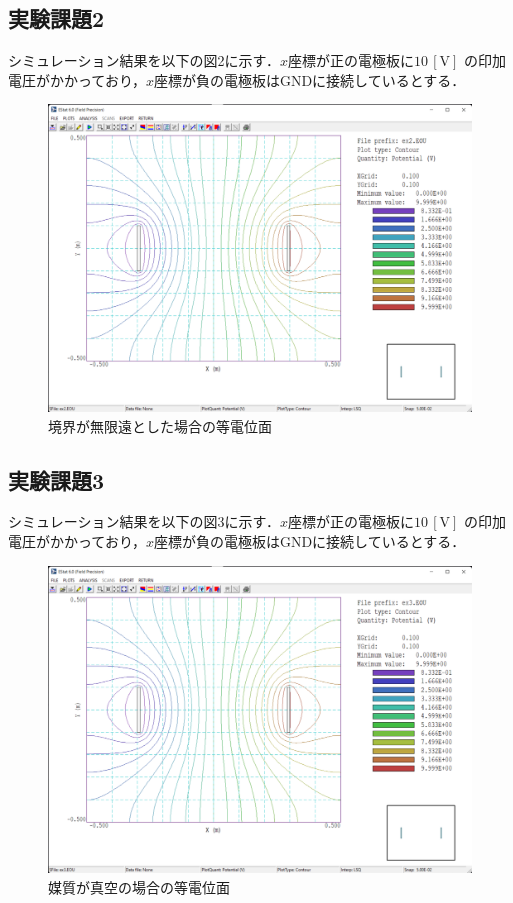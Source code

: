 \subsection{実験課題2}
シミュレーション結果を以下の図2に示す．$x$座標が正の電極板に$10\,[\si{\volt}]$
の印加電圧がかかっており，$x$座標が負の電極板はGNDに接続しているとする．
\begin{figure}[H]
    \begin{center}
        \includegraphics[scale=0.5]{figure2.pdf}
        \caption{境界が無限遠とした場合の等電位面}
    \end{center}
\end{figure}
\newpage

\subsection{実験課題3}
シミュレーション結果を以下の図3に示す．$x$座標が正の電極板に$10\,[\si{\volt}]$
の印加電圧がかかっており，$x$座標が負の電極板はGNDに接続しているとする．
\begin{figure}[H]
    \begin{center}
        \includegraphics[scale=0.5]{figure3.pdf}
        \caption{媒質が真空の場合の等電位面}
    \end{center}
\end{figure}
\newpage

